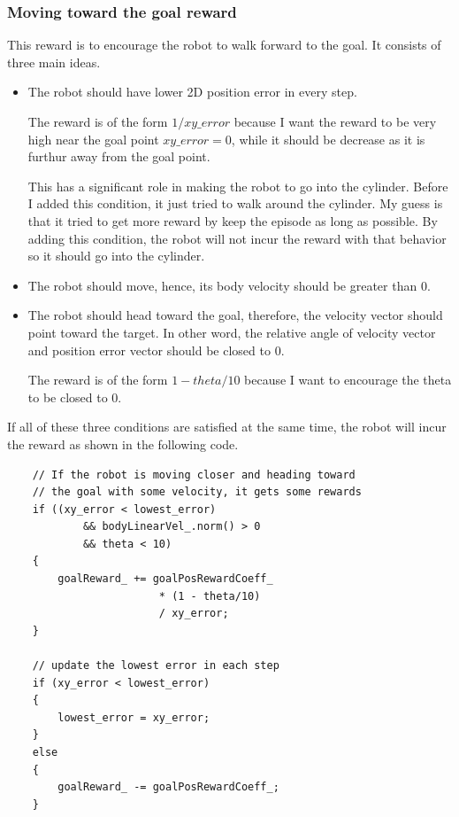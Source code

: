 \documentclass{article}
\begin{document}
    \subsubsection{Moving toward the goal reward}
        This reward is to encourage the robot to walk forward to the goal. It consists of three main ideas.
        \begin{itemize}
            \item The robot should have lower 2D position error in every step. 
                    
                    The reward is of the form $1/xy\_error$ because I want the reward to be very high near the goal point $xy\_error = 0$, 
                while it should be decrease as it is furthur away from the goal point.

                    This has a significant role in making the robot to go into the cylinder. 
                Before I added this condition, it just tried to walk around the cylinder. My guess is that it tried to get more reward by keep the episode as long as possible.
                By adding this condition, the robot will not incur the reward with that behavior so it should go into the cylinder.

            \item The robot should move, hence, its body velocity should be greater than 0.
            
            \item The robot should head toward the goal, therefore, the velocity vector should point toward the target. 
                    In other word, the relative angle of velocity vector and position error vector should be closed to 0.
                    
                    The reward is of the form $1 - theta/10$ because I want to encourage the theta to be closed to 0.
        \end{itemize}

        If all of these three conditions are satisfied at the same time, the robot will incur the reward as shown in the following code.

    \begin{verbatim}
    // If the robot is moving closer and heading toward 
    // the goal with some velocity, it gets some rewards
    if ((xy_error < lowest_error) 
            && bodyLinearVel_.norm() > 0 
            && theta < 10)
    {
        goalReward_ += goalPosRewardCoeff_ 
                        * (1 - theta/10) 
                        / xy_error;
    }

    // update the lowest error in each step
    if (xy_error < lowest_error)
    {
        lowest_error = xy_error;
    }
    else
    {
        goalReward_ -= goalPosRewardCoeff_;
    }
    \end{verbatim}
\end{document}
